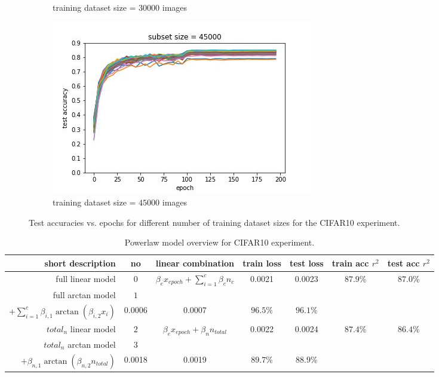 \documentclass{article} %
\begin{document}
\begin{figure}
\begin{subfigure}{.5\textwidth}
        \caption{training dataset size = $30000$ images}
        \label{fig:subsetsize30000}
    \end{subfigure}%
    \begin{subfigure}{.5\textwidth}
        \centering
        \includegraphics[width=.8\linewidth]{cifar10/test_acc_vs_epoch_subset_size_45000.jpg}
        \caption{training dataset size = $45000$ images}
        \label{fig:subsetsize45000}
    \end{subfigure}

    \caption{Test accuracies vs. epochs for different number of training dataset sizes for the CIFAR10 experiment.}
    \label{fig:accuracy_vs_epoch_by_subset_size_cifar}
\end{figure}


\begin{table}[h!]
    \centering
    \begin{tabular}{|r|c|c|c|c|c|c|}
        \hline
        short description   & no  & linear combination                               & train loss & test loss & train acc $r^2$ & test acc $r^2$ \\
        \hline
        full linear model          & $0$ & $\beta_e x_{epoch} + \sum_{i = 1}^c \beta_c n_c$ & 0.0021    & 0.0023   & $87.9\%$        & $87.0\%$       \\
        \hline
        full arctan model & $1$& \makecell{$\beta_{e, 1} \arctan{(\beta_{e, 2} x_{epoch})}$ \\  $+ \sum_{i = 1}^c \beta_{i, 1} \arctan{(\beta_{i, 2} x_{i})}$}& 0.0006 & 0.0007 & $96.5\%$ & $96.1\%$ \\
        \hline
        $total_n$ linear model & $2$ & $\beta_e x_{epoch} + \beta_n n_{total}$          & 0.0022    & 0.0024   & $87.4\%$        & $86.4\%$       \\
        \hline
        $total_n$ arctan model &$3$&\makecell{ $\beta_{e, 1} \arctan{(\beta_{e, 2} x_{epoch})}$ \\ $+ \beta_{n, 1} \arctan{(\beta_{n, 2} n_{total})}$} & 0.0018 & 0.0019 & $89.7\%$ & $88.9\%$ \\
        \hline
    \end{tabular}
    \caption{Powerlaw model overview for CIFAR10 experiment.}
    \label{table:cifar_model_overview}
\end{table}
\end{document}
